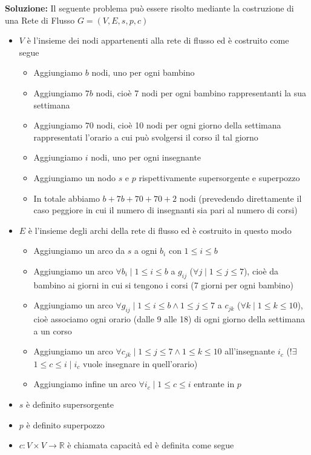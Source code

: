 \documentclass[../cheatSheetAlgoritmi.tex]{subfiles}
\begin{document}
\textbf{Soluzione:} Il seguente problema può essere risolto mediante la costruzione di una Rete di Flusso $G = (V, E, s, p, c)$
\begin{itemize}
	\item $V$ è l'insieme dei nodi appartenenti alla rete di flusso ed è costruito come segue 
	\begin{itemize}
		\item Aggiungiamo $b$ nodi, uno per ogni bambino
		\item Aggiungiamo $7b$ nodi, cioè 7 nodi per ogni bambino rappresentanti la sua settimana
		\item Aggiungiamo $70$ nodi, cioè 10 nodi per ogni giorno della settimana rappresentati l'orario a cui può svolgersi il corso il tal giorno
		\item Aggiungiamo $i$ nodi, uno per ogni insegnante
		\item Aggiungiamo un nodo $s$ e $p$ rispettivamente supersorgente e superpozzo
		\item In totale abbiamo $b + 7b + 70 + 70 + 2$ nodi (prevedendo direttamente il caso peggiore in cui il numero di insegnanti sia pari al numero di corsi)
	\end{itemize}
	\item $E$ è l'insieme degli archi della rete di flusso ed è costruito in questo modo
	\begin{itemize}
		\item Aggiungiamo un arco da $s$ a ogni $b_{i}$ con $1 \leq i \leq b$
		\item Aggiungiamo un arco $\forall b_{i} \mid 1 \leq i \leq b$ a $g_{ij}$ ($ \forall j \mid 1\leq j \leq 7$), cioè da bambino ai giorni in cui si tengono i corsi (7 giorni per ogni bambino)
		\item Aggiungiamo un arco $\forall  g_{ij} \mid 1 \leq i \leq b \land 1 \leq j \leq 7$ a $c_{jk}$ ($\forall k \mid 1 \leq k \leq 10$), cioè associamo ogni orario (dalle 9 alle 18) di ogni giorno della settimana a un corso
		\item Aggiungiamo un arco $\forall  c_{jk} \mid 1 \leq j \leq 7 \land 1 \leq k \leq 10$ all'insegnante $i_{c}$ (!$\exists$ $1 \leq c \leq i \mid i_{c}$ vuole insegnare in quell'orario)
		\item Aggiungiamo infine un arco $\forall i_{c} \mid 1 \leq c \leq i$ entrante in $p$
	\end{itemize}
	\item $s$ è definito supersorgente
	\item $p$ è definito superpozzo
	\item $c: V \times V \rightarrow \mathbb{R}$ è chiamata capacità ed è definita come segue

\end{itemize}
\end{document}

